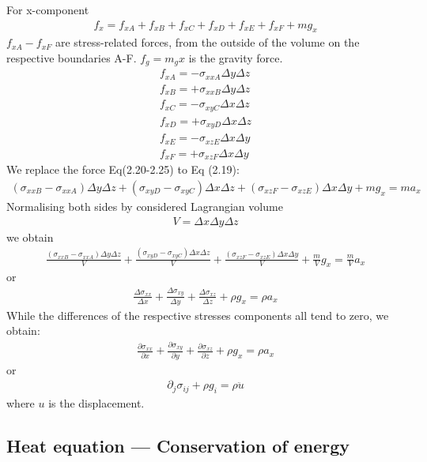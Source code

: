 For x-component
\begin{align}
f_x=f_{xA}+f_{xB}+f_{xC}+f_{xD}+f_{xE}+f_{xF}+mg_x 
\end{align}
$f_{xA}- f_{xF}$ are stress-related forces, from the outside of the volume on the respective boundaries A-F. 
$f_g=m_gx$ is the gravity force.
\begin{align}
f_{xA} = -\sigma_{xxA}\Delta y\Delta z\\
f_{xB} = +\sigma_{xxB}\Delta y\Delta z\\
f_{xC} = -\sigma_{xyC}\Delta x\Delta z\\
f_{xD} = +\sigma_{xyD}\Delta x\Delta z\\
f_{xE} = -\sigma_{xzE}\Delta x\Delta y\\
f_{xF} = +\sigma_{xzF}\Delta x\Delta y
\end{align}
We replace the force Eq(2.20-2.25) to Eq (2.19):
\begin{align}
(\sigma_{xxB}-\sigma_{xxA})\Delta y\Delta z+(\sigma_{xyD}-\sigma_{xyC})\Delta x\Delta z+(\sigma_{xzF}-\sigma_{xzE})\Delta x\Delta y+mg_x = ma_x 
\end{align}
Normalising both sides by considered Lagrangian volume
\begin{align}
V=\Delta x\Delta y\Delta z
\end{align}
we obtain
\begin{align}
\frac{(\sigma_{xxB}-\sigma_{xxA})\Delta y\Delta z}{V}+\frac{(\sigma_{xyD}-\sigma_{xyC})\Delta x\Delta z}{V}+\frac{(\sigma_{xzF}-\sigma_{xzE})\Delta x\Delta y}{V}+\frac{m}{V}g_x=\frac{m}{V}a_x
\end{align}
or
\begin{align}
\frac{\Delta\sigma_{xx}}{\Delta x}+\frac{\Delta\sigma_{xy}}{\Delta y}+\frac{\Delta\sigma_{xz}}{\Delta z}+\rho g_x = \rho a_x
\end{align}
While the differences of the respective stresses components all tend to zero, we obtain:
\begin{align}
\frac{\partial\sigma_{xx}}{\partial x}+\frac{\partial\sigma_{xy}}{\partial y}+\frac{\partial\sigma_{xz}}{\partial z}+\rho g_x = \rho a_x
\end{align}
or 
\begin{align}
\partial_j\sigma_{ij}+\rho g_i = \rho \ddot u
\end{align}
where $u$ is the displacement.
\subsection{Heat equation --- Conservation of energy}

